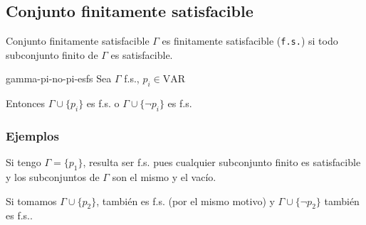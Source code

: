 \subsection{Conjunto finitamente satisfacible}

\begin{definicion}{Conjunto finitamente satisfacible}{}
    $\Gamma$ es finitamente satisfacible (\Verb+f.s.+) si todo subconjunto
    finito de $\Gamma$ es satisfacible.
\end{definicion}

\medskip

\begin{lema}{}{gamma-pi-no-pi-esfs}
    Sea $\Gamma$ f.s., $p_i \in \mathrm{VAR}$

    \medskip


    Entonces $\Gamma \cup \{ p_i \}$ es f.s. o $\Gamma \cup \{ \neg p_i \}$
    es f.s.
\end{lema}

\subsubsection{Ejemplos}

Si tengo $\Gamma = \{ p_1 \}$, resulta ser f.s. pues cualquier subconjunto
finito es satisfacible y los subconjuntos de $\Gamma$ son el mismo y el
vacío.

Si tomamos $\Gamma \cup \{ p_2 \}$, también es f.s. (por el mismo motivo) y 
$\Gamma \cup \{ \neg p_2 \}$ también es f.s..


